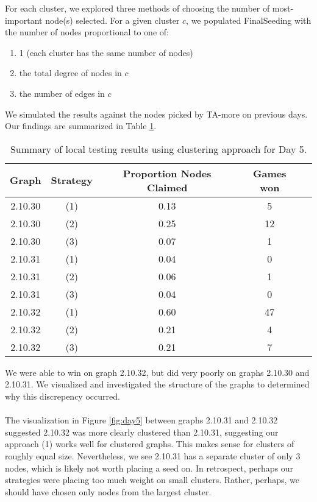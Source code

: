 \documentclass[letterpaper, 11pt]{article}
\begin{document}
\noindent For each cluster, we explored three methods of choosing the number of most-important node(s) selected. For a given cluster $c$, we populated FinalSeeding with the number of nodes proportional to one of:
\begin{enumerate}[label=(\arabic*)]
\item 1 (each cluster has the same number of nodes)
\item the total degree of nodes in $c$
\item the number of edges in $c$
\end{enumerate}

We simulated the results against the nodes picked by TA-more on previous days. Our findings are summarized in Table \ref{table:day5}.
\begin{table}[h!]\centering
\begin{tabular}{ccccc}
Graph & Strategy & Proportion Nodes Claimed & Games won \\ \hline
\toprule
2.10.30 & (1) & 0.13 & 5 \\
2.10.30 & (2) & 0.25 & 12 \\
2.10.30 & (3) & 0.07 & 1 \\
\midrule

2.10.31 & (1) & 0.04 & 0 \\
2.10.31 & (2) & 0.06 & 1 \\
2.10.31 & (3) & 0.04 & 0 \\
\midrule

2.10.32 & (1) & 0.60 & 47 \\
2.10.32 & (2) & 0.21 & 4 \\
2.10.32 & (3) & 0.21 & 7 \\
\midrule
\bottomrule
\end{tabular}
\caption{Summary of local testing results using clustering approach for Day 5.}
\label{table:day5}
\end{table}

\noindent We were able to win on graph 2.10.32, but did very poorly on graphs 2.10.30 and 2.10.31. We visualized and investigated the structure of the graphs to determined why this discrepency occurred.
\\\\
The visualization in Figure \ref{fig:day5} between graphs 2.10.31 and 2.10.32 suggested 2.10.32 was more clearly clustered than 2.10.31, suggesting our approach (1) works well for clustered graphs. This makes sense for clusters of roughly equal size. Nevertheless, we see 2.10.31 has a separate cluster of only 3 nodes, which is likely not worth placing a seed on. In retrospect, perhaps our strategies were placing too much weight on small clusters. Rather, perhaps, we should have chosen only nodes from the largest cluster.
\end{document}

